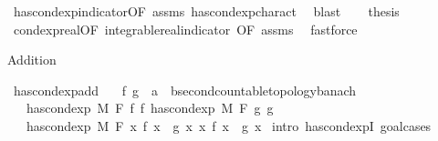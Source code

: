 \begin{isabellebody}
\ has{\isacharunderscore}{\kern0pt}cond{\isacharunderscore}{\kern0pt}exp{\isacharunderscore}{\kern0pt}indicator{\isacharbrackleft}{\kern0pt}OF\ assms{\isacharbrackright}{\kern0pt}\ has{\isacharunderscore}{\kern0pt}cond{\isacharunderscore}{\kern0pt}exp{\isacharunderscore}{\kern0pt}charact\ \isamarkupfalse%
\ blast\isanewline
\ \ \isamarkupfalse%
\ {\isacharquery}{\kern0pt}thesis\ \isamarkupfalse%
\ cond{\isacharunderscore}{\kern0pt}exp{\isacharunderscore}{\kern0pt}real{\isacharbrackleft}{\kern0pt}OF\ integrable{\isacharunderscore}{\kern0pt}real{\isacharunderscore}{\kern0pt}indicator{\isacharcomma}{\kern0pt}\ OF\ assms{\isacharbrackright}{\kern0pt}\ \isamarkupfalse%
\ fastforce\isanewline
{}\isamarkupfalse%
%
\endisatagproof
{\isafoldproof}%
%
\isadelimproof
%
\endisadelimproof
%
\begin{isamarkuptext}%
Addition%
\end{isamarkuptext}\isamarkuptrue%
\isamarkupfalse%
\ has{\isacharunderscore}{\kern0pt}cond{\isacharunderscore}{\kern0pt}exp{\isacharunderscore}{\kern0pt}add{\isacharcolon}{\kern0pt}\isanewline
\ \ \ f\ g\ {\isacharcolon}{\kern0pt}{\isacharcolon}{\kern0pt}\ {\isachardoublequoteopen}{\isacharprime}{\kern0pt}a\ {\isasymRightarrow}\ {\isacharprime}{\kern0pt}b{\isacharcolon}{\kern0pt}{\isacharcolon}{\kern0pt}{\isacharbraceleft}{\kern0pt}second{\isacharunderscore}{\kern0pt}countable{\isacharunderscore}{\kern0pt}topology{\isacharcomma}{\kern0pt}banach{\isacharbraceright}{\kern0pt}{\isachardoublequoteclose}\isanewline
\ \ \ {\isachardoublequoteopen}has{\isacharunderscore}{\kern0pt}cond{\isacharunderscore}{\kern0pt}exp\ M\ F\ f\ f{\isacharprime}{\kern0pt}{\isachardoublequoteclose}\ {\isachardoublequoteopen}has{\isacharunderscore}{\kern0pt}cond{\isacharunderscore}{\kern0pt}exp\ M\ F\ g\ g{\isacharprime}{\kern0pt}{\isachardoublequoteclose}\isanewline
\ \ \ {\isachardoublequoteopen}has{\isacharunderscore}{\kern0pt}cond{\isacharunderscore}{\kern0pt}exp\ M\ F\ {\isacharparenleft}{\kern0pt}{\isasymlambda}x{\isachardot}{\kern0pt}\ f\ x\ {\isacharplus}{\kern0pt}\ g\ x{\isacharparenright}{\kern0pt}\ {\isacharparenleft}{\kern0pt}{\isasymlambda}x{\isachardot}{\kern0pt}\ f{\isacharprime}{\kern0pt}\ x\ {\isacharplus}{\kern0pt}\ g{\isacharprime}{\kern0pt}\ x{\isacharparenright}{\kern0pt}{\isachardoublequoteclose}\isanewline
%
\isadelimproof
%
\endisadelimproof
%
\isatagproof
{}\isamarkupfalse%
\ {\isacharparenleft}{\kern0pt}intro\ has{\isacharunderscore}{\kern0pt}cond{\isacharunderscore}{\kern0pt}expI{\isacharprime}{\kern0pt}{\isacharcomma}{\kern0pt}\ goal{\isacharunderscore}{\kern0pt}cases{\isacharparenright}{\kern0pt}\isanewline

\end{isabellebody}
